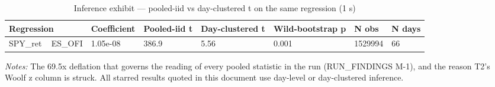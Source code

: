 \begin{table}[htbp]\centering
\caption{Inference exhibit — pooled-iid vs day-clustered t on the same regression (1 s)}
\label{tab:t15}
\small
\begin{tabular}{lllllll}
\toprule
Regression & Coefficient & Pooled-iid t & Day-clustered t & Wild-bootstrap p & N obs & N days \\
\midrule
SPY\_ret ~ ES\_OFI & 1.05e-08 & 386.9 & 5.56 & 0.001 & 1529994 & 66 \\
\bottomrule
\end{tabular}
\begin{minipage}{\linewidth}\vspace{2pt}\footnotesize\emph{Notes:} The 69.5x deflation that governs the reading of every pooled statistic in the run (RUN\_FINDINGS M-1), and the reason T2's Woolf z column is struck. All starred results quoted in this document use day-level or day-clustered inference.\end{minipage}
\end{table}
